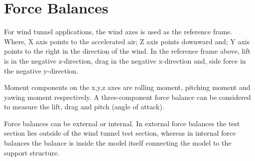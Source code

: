 \section{Force Balances}
For wind tunnel applications, the wind axes is used as the reference frame. Where, X axis points to the accelerated air; Z axis points downward and; Y axis points to the right in the direction of the wind. In the reference frame above, lift is in the negative z-direction, drag in the negative x-direction and, side force in the negative y-direction.

Moment components on the x,y,z axes are rolling moment, pitching moment and yawing moment respectively. A three-component force balance can be considered to measure the lift, drag and pitch (angle of attack).

Force balances can be external or internal. In external force balances the test section lies outside of the wind tunnel test section, whereas in internal force balances the balance is inside the model itself connecting the model to the support structure.

